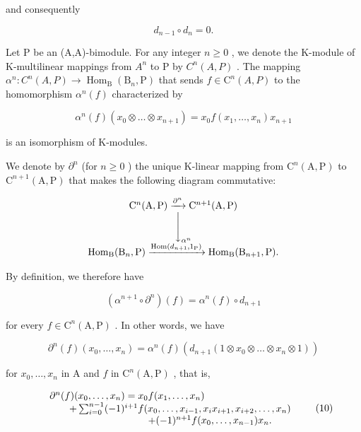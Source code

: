 and consequently

\[
d _ {n - 1} \circ d _ {n} = 0.\tag{7}
\]

Let P be an (A,A)-bimodule. For any integer \(n \geqslant 0\) , we denote the K-module of K-multilinear mappings from \(A^{n}\) to P by \(C^{n}(A,P)\) . The mapping \(\alpha^{n}: C^{n}(A,P) \to \operatorname{Hom}_{\mathrm{B}}(\mathrm{B}_{n},\mathrm{P})\) that sends \(f \in \mathrm{C}^{n}(A,P)\) to the homomorphism \(\alpha^{n}(f)\) characterized by

\[
\alpha^ {n} (f) \left(x _ {0} \otimes \dots \otimes x _ {n + 1}\right) = x _ {0} f (x _ {1}, \ldots , x _ {n}) x _ {n + 1}\tag{8}
\]

is an isomorphism of K-modules.

We denote by \(\partial^{n}\) (for \(n \geqslant 0\) ) the unique K-linear mapping from \(\mathrm{C}^{n}(\mathrm{A},\mathrm{P})\) to \(\mathrm{C}^{n+1}(\mathrm{A},\mathrm{P})\) that makes the following diagram commutative:

\[
\begin{array}{c} \mathrm{C} ^ {n} (\mathrm{A}, \mathrm{P}) \xrightarrow {\partial^ {n}} \mathrm{C} ^ {n + 1} (\mathrm{A}, \mathrm{P}) \\ \Biggl \downarrow_ {\alpha^ {n}} \\ \mathrm{Hom} _ {\mathrm{B}} (\mathrm{B} _ {n}, \mathrm{P}) \xrightarrow {\mathrm{Hom} (d _ {n + 1} , 1 _ {\mathrm{P}})} \mathrm{Hom} _ {\mathrm{B}} (\mathrm{B} _ {n + 1}, \mathrm{P}). \end{array}
\]

By definition, we therefore have

\[
(\alpha^ {n + 1} \circ \partial^ {n}) (f) = \alpha^ {n} (f) \circ d _ {n + 1}\tag{9}
\]

for every \(f \in \mathrm{C}^n(\mathrm{A},\mathrm{P})\) . In other words, we have

\[
\partial^ {n} (f) \left(x _ {0}, \dots , x _ {n}\right) = \alpha^ {n} (f) \left(d _ {n + 1} \left(1 \otimes x _ {0} \otimes \dots \otimes x _ {n} \otimes 1\right)\right)
\]

for \(x_0, \ldots, x_n\) in A and \(f\) in \(\mathrm{C}^n(\mathrm{A}, \mathrm{P})\) , that is,

\[
\begin{array}{r l} & {\partial^ {n} (f) (x _ {0}, \ldots , x _ {n}) = x _ {0} f (x _ {1}, \ldots , x _ {n})} \\ & {\qquad + \sum_ {i = 0} ^ {n - 1} (- 1) ^ {i + 1} f (x _ {0}, \ldots , x _ {i - 1}, x _ {i} x _ {i + 1}, x _ {i + 2}, \ldots , x _ {n})} \\ & {\qquad \qquad \qquad \qquad \qquad + (- 1) ^ {n + 1} f (x _ {0}, \ldots , x _ {n - 1}) x _ {n}.} \end{array}\tag{10}
\]

